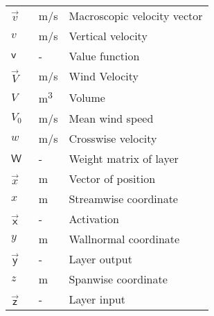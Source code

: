 \begin{longtable}{p{5cm}p{4cm}p{5cm}}
    $\vec{v}$               & \SI{}{m/s}    & Macroscopic velocity vector \\
    $v$                     & \SI{}{m/s}    & Vertical velocity \\    
    $\mathsf{v}$			& \SI{}{-}		& Value function \\
    $\vec{V}$				& \SI{}{m/s}	& Wind Velocity \\
    $V$						& \SI{}{m^3}	& Volume \\
    $V_0$					& \SI{}{m/s}	& Mean wind speed \\
    $w$                     & \SI{}{m/s}    & Crosswise velocity \\
    $\mathsf{W}$			& \SI{}{-}		& Weight matrix of layer \\
    $\vec{x}$               & \SI{}{m}      & Vector of position \\
    $x$                     & \SI{}{m}      & Streamwise coordinate \\
    $\vec{\mathsf{x}}$		& \SI{}{-}		& Activation \\
    $y$                     & \SI{}{m}      & Wallnormal coordinate \\
    $\vec{\mathsf{y}}$		& \SI{}{-}		& Layer output \\	
    $z$                     & \SI{}{m}      & Spanwise coordinate \\
    $\vec{\mathsf{z}}$		& \SI{}{-}		& Layer input \\
\end{longtable}

